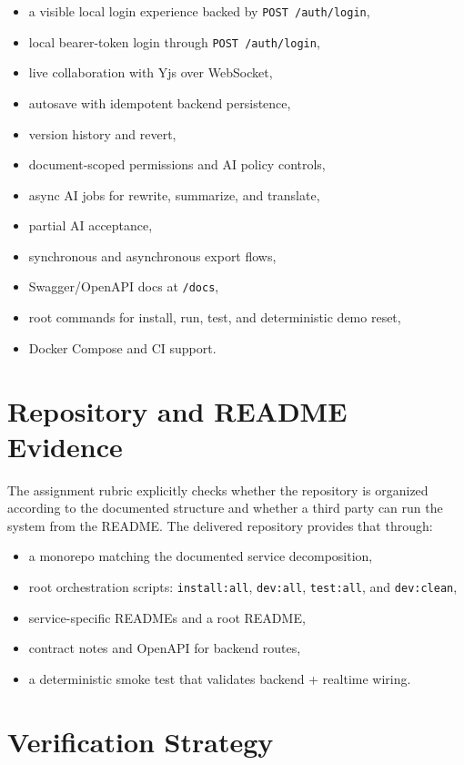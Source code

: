 \begin{itemize}
  \item a visible local login experience backed by \texttt{POST /auth/login},
  \item local bearer-token login through \texttt{POST /auth/login},
  \item live collaboration with Yjs over WebSocket,
  \item autosave with idempotent backend persistence,
  \item version history and revert,
  \item document-scoped permissions and AI policy controls,
  \item async AI jobs for rewrite, summarize, and translate,
  \item partial AI acceptance,
  \item synchronous and asynchronous export flows,
  \item Swagger/OpenAPI docs at \texttt{/docs},
  \item root commands for install, run, test, and deterministic demo reset,
  \item Docker Compose and CI support.
\end{itemize}

\section{Repository and README Evidence}

The assignment rubric explicitly checks whether the repository is organized according to the documented
structure and whether a third party can run the system from the README. The delivered repository provides
that through:

\begin{itemize}
  \item a monorepo matching the documented service decomposition,
  \item root orchestration scripts: \texttt{install:all}, \texttt{dev:all}, \texttt{test:all},
  and \texttt{dev:clean},
  \item service-specific READMEs and a root README,
  \item contract notes and OpenAPI for backend routes,
  \item a deterministic smoke test that validates backend + realtime wiring.
\end{itemize}

\section{Verification Strategy}

